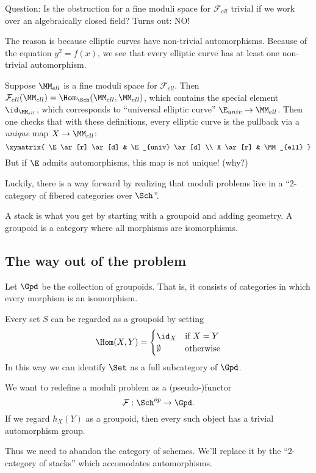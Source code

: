 \documentclass[11pt, english]{article}
\begin{document}
Question: Is the obstruction for a fine moduli space for $\mathcal F_{ell}$ trivial if we work over an algebraically closed field? Turns out: NO!

The reason is because elliptic curves have non-trivial automorphisms. Because of the equation $y^2=f(x)$, we see that every elliptic curve has at least one non-trivial automorphism.

Suppose $\MM_{ell}$ is a fine moduli space for $\mathcal F_{ell}$. Then $\mathcal F_{ell}(\MM_{ell})=\Hom_\Sch(\MM_{ell},\MM_{ell})$, which contains the special element $\id_{\MM_{ell}}$, which corresponds to ``universal elliptic curve'' $\E_{univ} \to \MM_{ell}$. Then one checks that with these definitions, every elliptic curve is the pullback via a \emph{unique} map $X \to \MM_{ell}$:
\[
\xymatrix{
\E \ar[r] \ar[d] & \E_{univ} \ar[d] \\
X \ar[r] & \MM_{ell}
}
\]
But if $\E$ admits automorphisms, this map is not unique! (why?)

Luckily, there is a way forward by realizing that moduli problems live in a ``2-category of fibered categories over $\Sch$''.

A stack is what you get by starting with a groupoid and adding geometry. A groupoid is a category where all morphisms are isomorphisms.

\subsection{The way out of the problem}

Let $\Gpd$ be the collection of groupoids. That is, it consists of categories in which every morphism is an isomorphism.

\begin{example}
Every set $S$ can be regarded as a groupoid by setting
\[
\Hom(X,Y) = \begin{cases} \id_X & \text{if } X=Y \\ \emptyset & \text{otherwise}\end{cases}
\]
In this way we can identify $\Set$ as a full subcategory of $\Gpd$.

We want to redefine a moduli problem as a (pseudo-)functor
\[
\mathcal F : \Sch^{op} \to \Gpd.
\]
If we regard $h_X(Y)$ as a groupoid, then every such object has a trivial automorphism group.
\end{example}
Thus we need to abandon the category of schemes. We'll replace it by the ``2-category of stacks'' which accomodates automorphisms.
\end{document}
